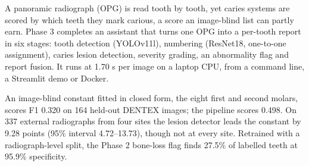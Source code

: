 \thispagestyle{empty}
\vspace*{12mm}
\vspace{4mm}
\begingroup
\justifying
A panoramic radiograph (OPG) is read tooth by tooth, yet caries systems are scored by which teeth
they mark carious, a score an image-blind list can partly earn. %
Phase 3 completes an assistant that turns one OPG into a per-tooth report in six stages: tooth
detection (YOLOv11l), numbering (ResNet18, one-to-one assignment), caries lesion detection, severity
grading, an abnormality flag and report fusion. %
It runs at 1.70 s per image on a laptop CPU, from a command line, a Streamlit demo or Docker. %

An image-blind constant fitted in closed form, the eight first and second molars, scores F1 0.320 on
164 held-out DENTEX images; the pipeline scores 0.498. %
On 337 external radiographs from four sites the lesion detector leads the constant by 9.28 points
(95\% interval 4.72--13.73), though not at every site. %
Retrained with a radiograph-level split, the Phase 2 bone-loss flag finds 27.5\% of labelled teeth at
95.9\% specificity. %
\par
\endgroup
\clearpage
